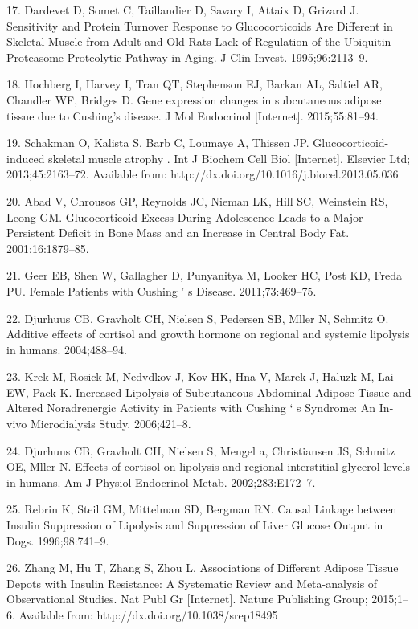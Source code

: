 \documentclass[11pt]{article} %
\begin{document}
17. Dardevet D, Somet C, Taillandier D, Savary I, Attaix D, Grizard J.
Sensitivity and Protein Turnover Response to Glucocorticoids Are
Different in Skeletal Muscle from Adult and Old Rats Lack of Regulation
of the Ubiquitin-Proteasome Proteolytic Pathway in Aging. J Clin Invest.
1995;96:2113--9.

18. Hochberg I, Harvey I, Tran QT, Stephenson EJ, Barkan AL, Saltiel AR,
Chandler WF, Bridges D. Gene expression changes in subcutaneous adipose
tissue due to Cushing's disease. J Mol Endocrinol {[}Internet{]}.
2015;55:81--94. 

19. Schakman O, Kalista S, Barb C, Loumaye A, Thissen JP.
Glucocorticoid-induced skeletal muscle atrophy . Int J Biochem Cell
Biol {[}Internet{]}. Elsevier Ltd; 2013;45:2163--72. Available from:
http://dx.doi.org/10.1016/j.biocel.2013.05.036

20. Abad V, Chrousos GP, Reynolds JC, Nieman LK, Hill SC, Weinstein RS,
Leong GM. Glucocorticoid Excess During Adolescence Leads to a Major
Persistent Deficit in Bone Mass and an Increase in Central Body Fat.
2001;16:1879--85.

21. Geer EB, Shen W, Gallagher D, Punyanitya M, Looker HC, Post KD,
Freda PU. Female Patients with Cushing ' s Disease. 2011;73:469--75.

22. Djurhuus CB, Gravholt CH, Nielsen S, Pedersen SB, Mller N, Schmitz
O. Additive effects of cortisol and growth hormone on regional and
systemic lipolysis in humans. 2004;488--94.

23. Krek M, Rosick M, Nedvdkov J, Kov HK, Hna V, Marek J, Haluzk
M, Lai EW, Pack K. Increased Lipolysis of Subcutaneous Abdominal
Adipose Tissue and Altered Noradrenergic Activity in Patients with
Cushing ` s Syndrome: An In-vivo Microdialysis Study. 2006;421--8.

24. Djurhuus CB, Gravholt CH, Nielsen S, Mengel a, Christiansen JS,
Schmitz OE, Mller N. Effects of cortisol on lipolysis and regional
interstitial glycerol levels in humans. Am J Physiol Endocrinol Metab.
2002;283:E172--7.

25. Rebrin K, Steil GM, Mittelman SD, Bergman RN. Causal Linkage between
Insulin Suppression of Lipolysis and Suppression of Liver Glucose Output
in Dogs. 1996;98:741--9.

26. Zhang M, Hu T, Zhang S, Zhou L. Associations of Different Adipose
Tissue Depots with Insulin Resistance: A Systematic Review and
Meta-analysis of Observational Studies. Nat Publ Gr {[}Internet{]}.
Nature Publishing Group; 2015;1--6. Available from:
http://dx.doi.org/10.1038/srep18495
\end{document}
